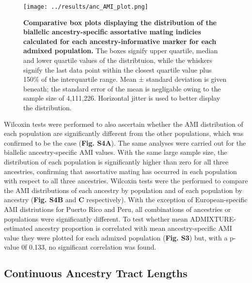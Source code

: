 \documentclass[11pt]{article}
\begin{document}
\begin{figure}[p]%
    \centering
    \texttt{[image: ../results/anc\_AMI\_plot.png]} 
    \vspace{.2cm}
    \caption{\textbf{
        Comparative box plots displaying the distribution of the biallelic ancestry-specific assortative mating indicies calculated for each ancestry-informative marker for each admixed population.
    }
        The boxes signify upper quartile, median and lower quartile values of the distribtuion, while the whiskers signify the last data point within the closest quartile value plus 150\% of the interquartile range. Mean ± standard deviation is given beneath; the standard error of the mean is negligable owing to the sample size of 4,111,226. Horizontal jitter is used to better display the distribution.
    }
\end{figure}



Wilcoxin tests were performed to also ascertain whether the AMI distribution of each population are significantly different from the other populations, which was confirmed to be the case (\textbf{Fig. S4A}). 
The same analyses were carried out for the biallelic ancestry-specific AMI values. With the same large sample size, the distribution of each population is significantly higher than zero for all three ancestries, confirming that assortative mating has occurred in each population with respect to all three ancestries. Wilcoxin tests were the performed to compare the AMI distributions of each ancestry by population and of each population by ancestry (\textbf{Fig. S4B} and \textbf{C} respectively). With the exception of European-specific AMI distriutions for Puerto Rico and Peru, all combinations of ancestries or populations were significantly different. 
To test whether mean ADMIXTURE-estimated ancestry proportion is correlated with mean ancestry-specific AMI value they were plotted for each admixed population (\textbf{Fig. S3}) but, with a p-value 0f 0.133, no significant correlation was found. 







\subsection{Continuous Ancestry Tract Lengths}
\end{document}
